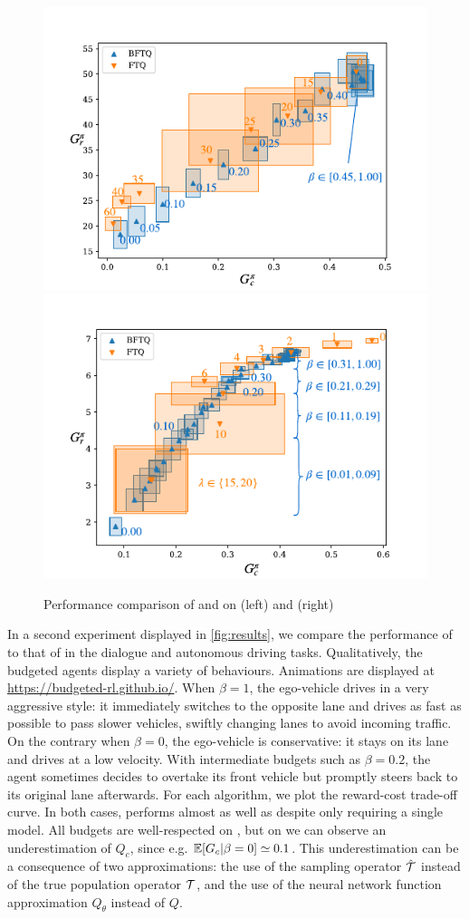 \begin{figure}[tp]
	\begin{center}
		\includegraphics[width=0.49\linewidth]{img/slot-filling}
		\includegraphics[width=0.49\linewidth]{img/highway}
		\caption{Performance comparison of \FTQl and \BFTQ on  (left) and (right) }
		\label{fig:results}
	\end{center}
\end{figure}

In a second experiment displayed in \autoref{fig:results}, we compare the performance of \FTQl to that of \BFTQ in the dialogue and autonomous driving tasks. 
Qualitatively, the budgeted agents display a variety of behaviours. Animations are displayed at  \href{https://budgeted-rl.github.io/\#driving-styles}{https://budgeted-rl.github.io/}. When $\beta = 1$, the ego-vehicle drives in a very aggressive style: it immediately switches to the opposite lane and drives as fast as possible to pass slower vehicles, swiftly changing lanes to avoid incoming traffic. On the contrary when $\beta = 0$, the ego-vehicle is conservative: it stays on its lane and drives at a low velocity. With intermediate budgets such as $\beta = 0.2$, the agent sometimes decides to overtake its front vehicle but promptly steers back to its original lane afterwards.
For each algorithm, we plot the reward-cost trade-off curve. In both cases, \BFTQ performs almost as well as \FTQl despite only requiring a single model. All budgets are well-respected on , but on  we can observe an underestimation of $Q_c$, since e.g. $\operatorname*{\mathbb{E}}[G_c|\beta=0] \simeq 0.1 $. This underestimation can be a consequence of two approximations: the use of the sampling operator $\hat{\mathcal{T}}$ instead of the true population operator $\mathcal{T}$, and the use of the neural network function approximation $Q_\theta$ instead of $Q$. 


